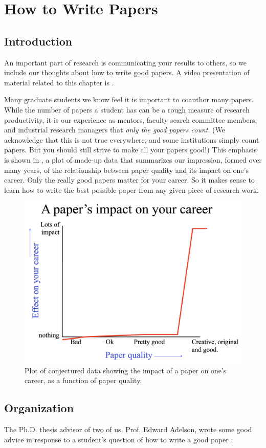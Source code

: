 
\chapter{How to Write Papers}
\label{chapter:how_to_write_papers}

\section{Introduction}
An important part of research is communicating your results to others, so we include our thoughts about how to write good papers.  A video presentation of material related to this chapter is \cite{FreemanPapers2020}.

Many graduate students we know feel it is important to coauthor many papers.  While the number of papers a student has can be a rough measure of research productivity, it is our experience as mentors, faculty search committee members, and industrial research managers that {\em only the good papers count}. (We acknowledge that this is not true everywhere, and some institutions simply count papers. But you should still strive to make all your papers good!)  This emphasis is shown in \fig{\ref{fig:impact}}, a plot of made-up data that summarizes our impression, formed over many years, of the relationship between paper quality and its impact on one's career.  Only the really good papers matter for your career.  So it makes sense to learn how to write the best possible paper from any given piece of research work.

\begin{figure}
    \centerline{
        \includegraphics[width=0.60\linewidth]{figures/papers/impact.jpg}}
    \caption{Plot of conjectured data showing the impact of a paper on one's career, as a function of paper quality. }
    \label{fig:impact}
\end{figure}


\section{Organization}
The Ph.D. thesis advisor of two of us, Prof. Edward Adelson, wrote some good advice in response to a student's question of how to write a good paper \cite{Adelson92}:

